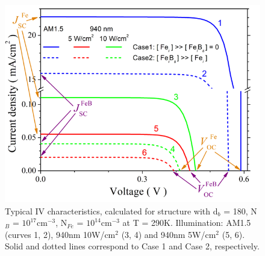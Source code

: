 \documentclass[a4paper,fleqn]{cas-sc}
\begin{document}
\begin{figure}
	\centering
		\includegraphics{Figure2.png}
	  \caption{Typical IV characteristics, calculated for structure with d$_b$ = 180\textnormal{\textmu}, N$_B$ = $10^{17}$$\mathrm{cm}^{-3}$, N$_{Fe}$ = $10^{14}$$\mathrm{cm}^{-3}$ at T = 290K. Illumination: AM1.5 (curves 1, 2), 940nm 10W/$\mathrm{cm}^{2}$ (3, 4) and 940nm 5W/$\mathrm{cm}^{2}$ (5, 6). Solid and dotted lines correspond to Case 1 and Case 2, respectively.}\label{fig2}
\end{figure}






\end{document}
